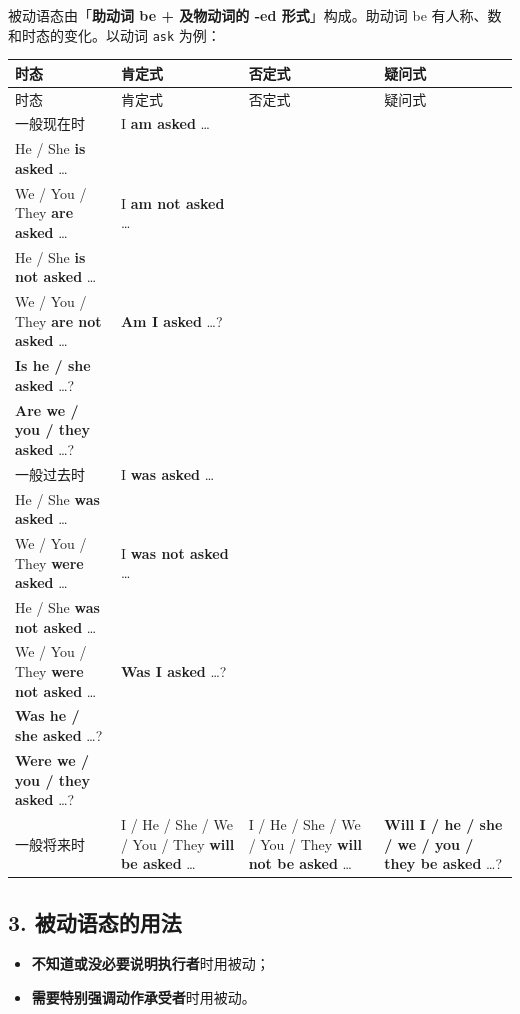 \documentclass[11pt,a4paper]{ctexart}
\begin{document}
被动语态由「\textbf{助动词 be + 及物动词的 -ed 形式}」构成。助动词 be 有人称、数和时态的变化。以动词 \texttt{ask} 为例：

{\footnotesize
\begin{longtable}{p{3.35cm}p{3.35cm}p{3.35cm}p{3.35cm}}
\hline
时态 & 肯定式 & 否定式 & 疑问式 \\
\hline
\endfirsthead
\hline
时态 & 肯定式 & 否定式 & 疑问式 \\
\hline
\endhead
\hline
\endfoot
一般现在时 & I \textbf{am asked} …\\ He / She \textbf{is asked} …\\ We / You / They \textbf{are asked} … & I \textbf{am not asked} …\\ He / She \textbf{is not asked} …\\ We / You / They \textbf{are not asked} … & \textbf{Am I asked} …?\\ \textbf{Is he / she asked} …?\\ \textbf{Are we / you / they asked} …? \\
一般过去时 & I \textbf{was asked} …\\ He / She \textbf{was asked} …\\ We / You / They \textbf{were asked} … & I \textbf{was not asked} …\\ He / She \textbf{was not asked} …\\ We / You / They \textbf{were not asked} … & \textbf{Was I asked} …?\\ \textbf{Was he / she asked} …?\\ \textbf{Were we / you / they asked} …? \\
一般将来时 & I / He / She / We / You / They \textbf{will be asked} … & I / He / She / We / You / They \textbf{will not be asked} … & \textbf{Will I / he / she / we / you / they be asked} …? \\
\end{longtable}
}

\subsection*{3. 被动语态的用法}

\begin{itemize}[leftmargin=1.4em]
\item \textbf{不知道或没必要说明执行者}时用被动；
\item \textbf{需要特别强调动作承受者}时用被动。
\end{itemize}
\end{document}
